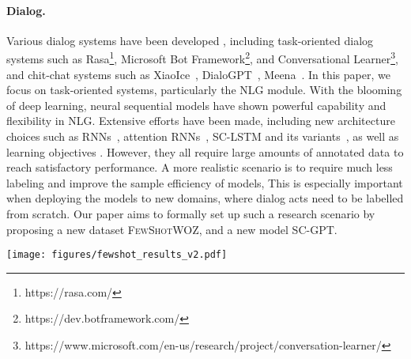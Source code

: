 \documentclass[11pt,a4paper]{article}
\newcommand{\data}{\textsc{FewShotWOZ}}
\begin{document}
\paragraph{Dialog.} 
Various dialog systems have been developed \citep{gao2019neural}, including task-oriented dialog systems such as Rasa\footnote{https://rasa.com/}, Microsoft Bot Framework\footnote{https://dev.botframework.com/}, and Conversational Learner\footnote{https://www.microsoft.com/en-us/research/project/conversation-learner/}, and chit-chat systems such as XiaoIce~\cite{zhou2018design}, DialoGPT~\cite{zhang2019dialogpt}, Meena~\cite{adiwardana2020towards}. 
In this paper, we focus on task-oriented systems, particularly the NLG module. 
With the blooming of deep learning, neural sequential models have shown powerful capability and flexibility in NLG. Extensive efforts have been made, including new architecture choices such as RNNs~\citep{wen-etal-2015-stochastic}, attention RNNs~\citep{dusek-jurcicek-2016-sequence}, SC-LSTM  \citep{wen-etal-2015-semantically} and its variants~\citep{tran-etal-2017-neural, tran-nguyen-2017-natural}, as well as learning objectives 
\citep{zhu-etal-2019-multi}. However, they all require large amounts of annotated data to reach satisfactory performance. 
A more realistic scenario is to require much less labeling and improve the sample efficiency of models, This is especially important when deploying the models to new domains, where dialog acts need to be labelled from scratch. Our paper aims to formally set up such a research scenario by proposing a new dataset \data{}, and a new model SC-GPT.


















\begin{table*}[t!]
\footnotesize
\centering
\texttt{[image: figures/fewshot\_results\_v2.pdf]}
\caption{Performance of different methods on \data{}} 
\label{tab:res_fewshotwoz}
\vspace{-2mm}
\end{table*}
\end{document}
